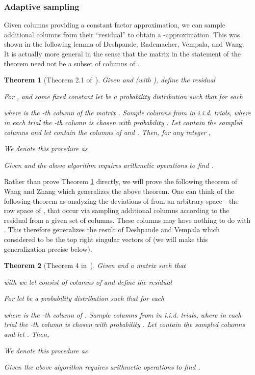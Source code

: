 \documentclass[11pt]{article}
\newtheorem{theorem}{Theorem}
\def\math#1{}
\begin{document}
\subsubsection{Adaptive sampling}\label{sec:adaptiveSampling}
Given  columns providing a constant factor approximation, we can sample  additional 
columns from their ``residual'' to obtain a -approximation. This was shown in the following
lemma of Deshpande, Rademacher, Vempala, and Wang. It is actually more general in the sense that the matrix 
in the statement of the theorem need not be a subset of columns of . 

\begin{theorem}[Theorem 2.1 of~\cite{DRVW06}]
\label{thm:adaptivecolumns}
Given  and  (with ),
define the residual

For , and some fixed constant   let  be a probability distribution such that for each 

where  is the -th column of the matrix . Sample
 columns from  in \math{c_2} i.i.d. trials, where in each trial the -th column is chosen with probability .
Let  contain the  sampled columns and let 
contain the columns of  and . Then, for any integer ,

We denote this procedure as

Given  and  the above algorithm requires  arithmetic operations to find .
\end{theorem}
Rather than prove Theorem \ref{thm:adaptivecolumns} directly, we will prove the following theorem of Wang and Zhang 
which generalizes
the above theorem. One can think
of the following theorem as analyzing the deviations of  from an
arbitrary space - the row space of , that occur via sampling additional
columns according to the residual from a given set of columns. These columns
may have nothing to do with . This therefore generalizes the result
of Deshpande and Vempala which considered  to be the top  right singular
vectors of  (we will make this generalization precise below). 
\begin{theorem}[Theorem 4 in~\cite{WZ13CUR}]
\label{thm:adaptiverows}
Given  and a matrix  such that 

with 
we let  consist of  columns of  
and define the residual 

For  let  be a probability distribution such that for each 

where  is the -th column of . Sample
 columns from  in \math{c_2} i.i.d. trials, 
where in each trial the -th column is chosen with probability .
Let  
contain the  sampled columns and let .
Then,

We denote this procedure as

Given   
the above algorithm requires  arithmetic operations to find .
\end{theorem}
\end{document}

